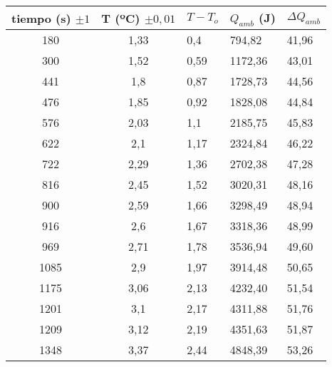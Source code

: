 \documentclass[a4paper,12pt,spanish]{article}
\begin{document}
\begin{table}[H]
	\centering
	\begin{tabular}{|c|c|l|l|l|}
		\hline
		tiempo (s) $\pm 1$ & T (ºC) $\pm 0,01$ & $T-T_o$ & $Q_{amb}$ (J) & $\Delta Q_{amb}$ \\ \hline\hline
		180                & 1,33              & 0,4     & 794,82    & 41,96            \\ \hline
		300                & 1,52              & 0,59    & 1172,36   & 43,01            \\ \hline
		441                & 1,8               & 0,87    & 1728,73   & 44,56            \\ \hline
		476                & 1,85              & 0,92    & 1828,08   & 44,84            \\ \hline
		576                & 2,03              & 1,1     & 2185,75   & 45,83            \\ \hline
		622                & 2,1               & 1,17    & 2324,84   & 46,22            \\ \hline
		722                & 2,29              & 1,36    & 2702,38   & 47,28            \\ \hline
		816                & 2,45              & 1,52    & 3020,31   & 48,16            \\ \hline
		900                & 2,59              & 1,66    & 3298,49   & 48,94            \\ \hline
		916                & 2,6               & 1,67    & 3318,36   & 48,99            \\ \hline
		969                & 2,71              & 1,78    & 3536,94   & 49,60            \\ \hline
		1085               & 2,9               & 1,97    & 3914,48   & 50,65            \\ \hline
		1175               & 3,06              & 2,13    & 4232,40   & 51,54            \\ \hline
		1201               & 3,1               & 2,17    & 4311,88   & 51,76            \\ \hline
		1209               & 3,12              & 2,19    & 4351,63   & 51,87            \\ \hline
		1348               & 3,37              & 2,44    & 4848,39   & 53,26            \\ \hline

\end{tabular}
\end{table}
\end{document}
